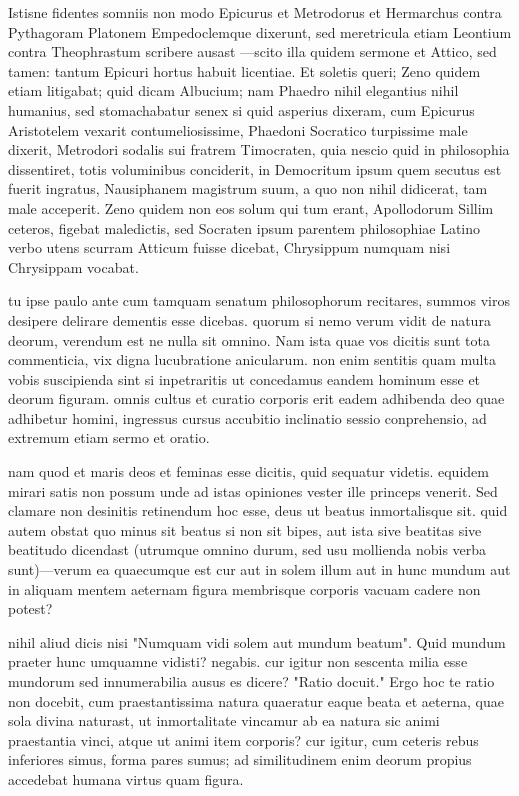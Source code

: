  Istisne fidentes somniis non modo Epicurus et Metrodorus et Hermarchus contra Pythagoram Platonem Empedoclemque dixerunt, sed meretricula etiam Leontium contra Theophrastum scribere ausast —scito illa quidem sermone et Attico, sed tamen: tantum Epicuri hortus habuit licentiae. Et soletis queri; Zeno quidem etiam litigabat; quid dicam Albucium; nam Phaedro nihil elegantius nihil humanius, sed stomachabatur senex si quid asperius dixeram, cum Epicurus Aristotelem vexarit contumeliosissime, Phaedoni Socratico turpissime male dixerit, Metrodori sodalis sui fratrem Timocraten, quia nescio quid in philosophia dissentiret, totis voluminibus conciderit, in Democritum ipsum quem secutus est fuerit ingratus, Nausiphanem magistrum suum, a quo non nihil didicerat, tam male acceperit. Zeno quidem non eos solum qui tum erant, Apollodorum Sillim ceteros, figebat maledictis, sed Socraten ipsum parentem philosophiae Latino verbo utens scurram Atticum fuisse dicebat, Chrysippum numquam nisi Chrysippam vocabat.

 tu ipse paulo ante cum tamquam senatum philosophorum recitares, summos viros desipere delirare dementis esse dicebas. quorum si nemo verum vidit de natura deorum, verendum est ne nulla sit omnino. Nam ista quae vos dicitis sunt tota commenticia, vix digna lucubratione anicularum. non enim sentitis quam multa vobis suscipienda sint si inpetraritis ut concedamus eandem hominum esse et deorum figuram. omnis cultus et curatio corporis erit eadem adhibenda deo quae adhibetur homini, ingressus cursus accubitio inclinatio sessio conprehensio, ad extremum etiam sermo et oratio.

 nam quod et maris deos et feminas esse dicitis, quid sequatur videtis. equidem mirari satis non possum unde ad istas opiniones vester ille princeps venerit. Sed clamare non desinitis retinendum hoc esse, deus ut beatus inmortalisque sit. quid autem obstat quo minus sit beatus si non sit bipes, aut ista sive beatitas sive beatitudo dicendast (utrumque omnino durum, sed usu mollienda nobis verba sunt)—verum ea quaecumque est cur aut in solem illum aut in hunc mundum aut in aliquam mentem aeternam figura membrisque corporis vacuam cadere non potest?

 nihil aliud dicis nisi "Numquam vidi solem aut mundum beatum". Quid mundum praeter hunc umquamne vidisti? negabis. cur igitur non sescenta milia esse mundorum sed innumerabilia ausus es dicere? "Ratio docuit." Ergo hoc te ratio non docebit, cum praestantissima natura quaeratur eaque beata et aeterna, quae sola divina naturast, ut inmortalitate vincamur ab ea natura sic animi praestantia vinci, atque ut animi item corporis? cur igitur, cum ceteris rebus inferiores simus, forma pares sumus; ad similitudinem enim deorum propius accedebat humana virtus quam figura.

